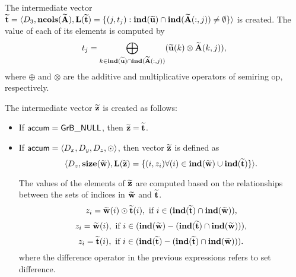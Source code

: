 The intermediate vector ${\bf \widetilde{t}} = \langle
D_3, \bold{ncols}({\bf \widetilde{A}}),
\bold{L}({\bf \widetilde{t}}) =
\{(j,t_j) : \bold{ind}({\bf \widetilde{u}}) \cap
\bold{ind}({\bf \widetilde{A}}(:,j)) \neq \emptyset \} \rangle$
is created.  The value of each of its elements is computed by \[t_j
= \bigoplus_{k \in \bold{ind}({\bf \widetilde{u}}) \cap
\bold{ind}({\bf \widetilde{A}}(:,j))} ({\bf \widetilde{u}}(k)
\otimes {\bf \widetilde{A}}(k,j)),\] where $\oplus$ and $\otimes$
are the additive and multiplicative operators of semiring {\sf op},
respectively.

The intermediate vector ${\bf \widetilde{z}}$ is created as follows:
\begin{itemize}
    \item If ${\sf accum} = {\sf GrB\_NULL}$, then ${\bf \widetilde{z}} = {\bf \widetilde{t}}$. 
    
    \item If ${\sf accum} = \langle D_x, D_y, D_z, \odot \rangle$, then vector ${\bf \widetilde{z}}$ is defined as 
        \[ \langle D_z, \bold{size}({\bf \widetilde{w}}), 
        \bold{L}({\bf \widetilde{z}}) 
		= \{(i,z_{i})  \forall (i) \in \bold{ind}({\bf \widetilde{w}}) \cup 
        \bold{ind}({\bf \widetilde{t}}) \} \rangle.\]  

    The values of the elements of ${\bf \widetilde{z}}$ are computed based on the 
    relationships between the sets of indices in ${\bf \widetilde{w}}$ and 
    ${\bf \widetilde{t}}$.
\[
z_{i} = {\bf \widetilde{w}}(i) \odot {\bf \widetilde{t}}(i), \ \mbox{if}\  i \in  (\bold{ind}({\bf \widetilde{t}}) \cap \bold{ind}({\bf \widetilde{w}})),
\]
\[
z_{i} = \vector{\widetilde{w}}(i), \ \mbox{if}\  i \in  (\bold{ind}(\vector{\widetilde{w}}) - (\bold{ind}(\vector{\widetilde{t}}) \cap \bold{ind}(\vector{\widetilde{w}}))),
\]
\[
z_{i} = \vector{\widetilde{t}}(i), \ \mbox{if}\  i \in  (\bold{ind}(\vector{\widetilde{t}}) - (\bold{ind}(\vector{\widetilde{t}}) \cap \bold{ind}(\vector{\widetilde{w}}))).
\]
where the difference operator in the previous expressions refers to set difference.
\end{itemize}

